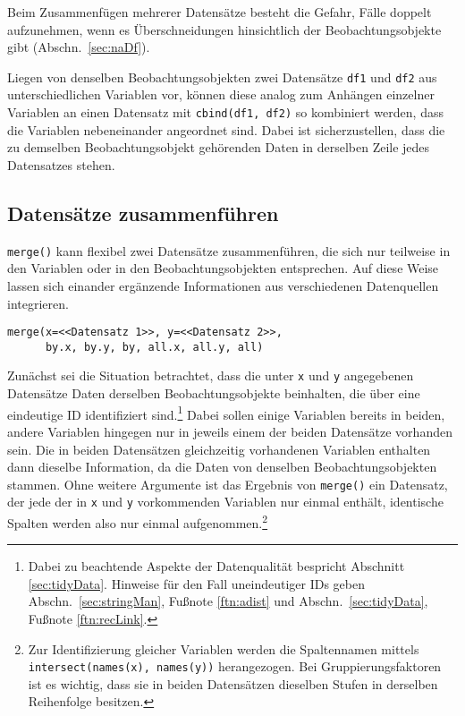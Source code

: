 Beim Zusammenfügen mehrerer Datensätze besteht die Gefahr, Fälle doppelt aufzunehmen, wenn es Überschneidungen hinsichtlich der Beobachtungsobjekte gibt (Abschn.\ \ref{sec:naDf}).

Liegen von denselben Beobachtungsobjekten zwei Datensätze \lstinline!df1! und \lstinline!df2! aus unterschiedlichen Variablen vor, können diese analog zum Anhängen einzelner Variablen an einen Datensatz mit \lstinline!cbind(df1, df2)! so kombiniert werden, dass die Variablen nebeneinander angeordnet sind. Dabei ist sicherzustellen, dass die zu demselben Beobachtungsobjekt gehörenden Daten in derselben Zeile jedes Datensatzes stehen.

\subsection{Datensätze zusammenführen}
\label{sec:merge}

\lstinline!merge()! kann flexibel zwei Datensätze zusammenführen, die sich nur teilweise in den Variablen oder in den Beobachtungsobjekten entsprechen. Auf diese Weise lassen sich einander ergänzende Informationen aus verschiedenen Datenquellen integrieren.
\begin{lstlisting}
merge(x=<<Datensatz 1>>, y=<<Datensatz 2>>,
      by.x, by.y, by, all.x, all.y, all)
\end{lstlisting}

Zunächst sei die Situation betrachtet, dass die unter \lstinline!x! und \lstinline!y! angegebenen Datensätze Daten derselben Beobachtungsobjekte beinhalten, die über eine eindeutige ID identifiziert sind.\footnote{Dabei zu beachtende Aspekte der Datenqualität bespricht Abschnitt \ref{sec:tidyData}. Hinweise für den Fall uneindeutiger IDs geben Abschn.\ \ref{sec:stringMan}, Fußnote \ref{ftn:adist} und Abschn.\ \ref{sec:tidyData}, Fußnote \ref{ftn:recLink}.} Dabei sollen einige Variablen bereits in beiden, andere Variablen hingegen nur in jeweils einem der beiden Datensätze vorhanden sein. Die in beiden Datensätzen gleichzeitig vorhandenen Variablen enthalten dann dieselbe Information, da die Daten von denselben Beobachtungsobjekten stammen. Ohne weitere Argumente ist das Ergebnis von \lstinline!merge()! ein Datensatz, der jede der in \lstinline!x! und \lstinline!y! vorkommenden Variablen nur einmal enthält, identische Spalten werden also nur einmal aufgenommen.\footnote{Zur Identifizierung gleicher Variablen werden die Spaltennamen mittels \lstinline!intersect(names(x), names(y))! herangezogen. Bei Gruppierungsfaktoren ist es wichtig, dass sie in beiden Datensätzen dieselben Stufen in derselben Reihenfolge besitzen.}


